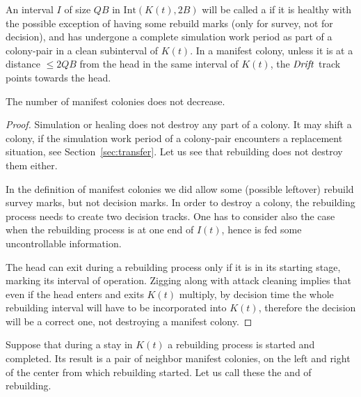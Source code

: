 \documentclass[11pt]{memoir}
\theoremstyle{definition} %
\renewcommand{\le}{\leq}
\newcommand{\fld}[1]{\ensuremath{\textit{#1\/}}}
\def\B{B}
\newcommand{\Int}{\mathrm{Int}} %
\newcommand{\Q}{Q} %
\newcommand{\Drift}{\fld{Drift}}
\begin{document}
 An interval \( I \) of size \( \Q\B \) in \( \Int(K(t), 2\B) \) will be called a  if
it is healthy with the possible exception of having some rebuild marks (only for survey, not
for decision), and has undergone a complete simulation work period as part of a colony-pair in a
clean subinterval of \( K(t) \).
In a manifest colony, 
unless it is at a distance \( \le 2\Q\B \) from the head in the same interval of \( K(t) \),
the \( \Drift \) track points towards the head.

\begin{lemma}\label{lem:escape.non-decr}
  The number of manifest colonies does not decrease.
\end{lemma}
\begin{proof}
  Simulation or healing does not destroy any part of a colony.
  It may shift a colony, if the simulation work period of a colony-pair encounters a
  replacement situation, see Section~\ref{sec:transfer}.
  Let us see that rebuilding does not destroy them either.

  In the definition of manifest colonies we did allow some (possible leftover)
  rebuild survey marks, but not decision marks.
  In order to destroy a colony, the rebuilding process needs to create two decision tracks.
  One has to consider also the case when the rebuilding process is at one end of \( I(t) \),
  hence is fed some uncontrollable information.

  The head can exit during a rebuilding process only if it is in its starting
  stage, marking its interval of operation.
  Zigging along with attack cleaning
  implies that even if the head enters and exits \( K(t) \) multiply,
  by decision time the whole
  rebuilding interval will have to be incorporated into \( K(t) \), therefore the decision will
  be a correct one, not destroying a manifest colony.
\end{proof}

    Suppose that during a stay in \( K(t) \) a rebuilding process is started and completed.
  Its result is a pair of neighbor manifest colonies, on the left and right of the
  center from which rebuilding started.
  Let us call these the  and  of rebuilding.
\end{document}
